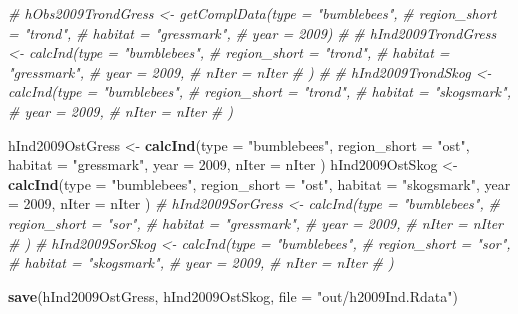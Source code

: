 \documentclass[]{article}
\newenvironment{Shaded}{\begin{snugshade}}{\end{snugshade}}
\newcommand{\KeywordTok}[1]{\textcolor[rgb]{0.13,0.29,0.53}{\textbf{#1}}}
\newcommand{\DataTypeTok}[1]{\textcolor[rgb]{0.13,0.29,0.53}{#1}}
\newcommand{\DecValTok}[1]{\textcolor[rgb]{0.00,0.00,0.81}{#1}}
\newcommand{\StringTok}[1]{\textcolor[rgb]{0.31,0.60,0.02}{#1}}
\newcommand{\CommentTok}[1]{\textcolor[rgb]{0.56,0.35,0.01}{\textit{#1}}}
\newcommand{\NormalTok}[1]{#1}
\begin{document}
\begin{Shaded}
\begin{Highlighting}[]
\CommentTok{# hObs2009TrondGress <- getComplData(type = "bumblebees",}
\CommentTok{#                                    region_short = "trond",}
\CommentTok{#                                    habitat = "gressmark",}
\CommentTok{#                                    year = 2009)}
\CommentTok{# }
\CommentTok{# hInd2009TrondGress <- calcInd(type = "bumblebees",}
\CommentTok{#                               region_short = "trond",}
\CommentTok{#                               habitat = "gressmark",}
\CommentTok{#                               year = 2009,}
\CommentTok{#                               nIter = nIter}
\CommentTok{#                               )}
\CommentTok{# }
\CommentTok{# hInd2009TrondSkog <- calcInd(type = "bumblebees",}
\CommentTok{#                               region_short = "trond",}
\CommentTok{#                               habitat = "skogsmark",}
\CommentTok{#                               year = 2009,}
\CommentTok{#                               nIter = nIter}
\CommentTok{#                               )}

\NormalTok{hInd2009OstGress <-}\StringTok{ }\KeywordTok{calcInd}\NormalTok{(}\DataTypeTok{type =} \StringTok{"bumblebees"}\NormalTok{,}
                              \DataTypeTok{region_short =} \StringTok{"ost"}\NormalTok{,}
                              \DataTypeTok{habitat =} \StringTok{"gressmark"}\NormalTok{,}
                              \DataTypeTok{year =} \DecValTok{2009}\NormalTok{,}
                              \DataTypeTok{nIter =}\NormalTok{ nIter}
\NormalTok{                              )}
\NormalTok{hInd2009OstSkog <-}\StringTok{ }\KeywordTok{calcInd}\NormalTok{(}\DataTypeTok{type =} \StringTok{"bumblebees"}\NormalTok{,}
                              \DataTypeTok{region_short =} \StringTok{"ost"}\NormalTok{,}
                              \DataTypeTok{habitat =} \StringTok{"skogsmark"}\NormalTok{,}
                              \DataTypeTok{year =} \DecValTok{2009}\NormalTok{,}
                              \DataTypeTok{nIter =}\NormalTok{ nIter}
\NormalTok{                              )}
\CommentTok{# hInd2009SorGress <- calcInd(type = "bumblebees",}
\CommentTok{#                               region_short = "sor",}
\CommentTok{#                               habitat = "gressmark",}
\CommentTok{#                               year = 2009,}
\CommentTok{#                               nIter = nIter}
\CommentTok{#                               )}
\CommentTok{# hInd2009SorSkog <- calcInd(type = "bumblebees",}
\CommentTok{#                               region_short = "sor",}
\CommentTok{#                               habitat = "skogsmark",}
\CommentTok{#                               year = 2009,}
\CommentTok{#                               nIter = nIter}
\CommentTok{#                               )}

\KeywordTok{save}\NormalTok{(hInd2009OstGress, hInd2009OstSkog, }\DataTypeTok{file =} \StringTok{"out/h2009Ind.Rdata"}\NormalTok{)}
\end{Highlighting}
\end{Shaded}
\end{document}
